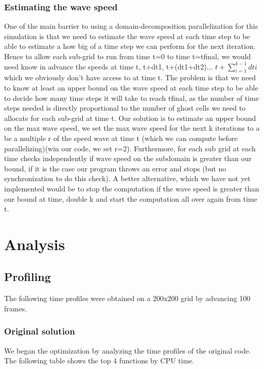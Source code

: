 \documentclass[11pt]{article}
\begin{document}
\subsubsection{Estimating the wave speed}
One of the main barrier to using a domain-decomposition parallelization for this simulation is that we need to estimate the wave speed at each time step to be able to estimate a how big of a time step we can perform for the next iteration. Hence to allow each sub-grid to run from time t=0 to time t=tfinal, we would need know in advance the speeds at time t, t+dt1, t+(dt1+dt2)... $t+\sum_{i=1}^{k-1}dti$ which we obviously don't have access to at time t. The problem is that we need to know at least an upper bound on the wave speed at each time step to be able to decide how many time steps it will take to reach tfinal, as the number of time steps needed is directly proportional to the number of ghost cells we need to allocate for each sub-grid at time t. Our solution is to estimate an upper bound on the max wave speed, we set the max wave speed for the next k iterations to a be a multiple r of the speed wave at time t (which we can compute before parallelizing)(win our code, we set r=2). Furthermore, for each sub grid at each time checks independently if wave speed on the subdomain is greater than our bound, if it is the case our program throws an error and stops (but no synchronization to do this check). A better alternative, which we have not yet implemented would be to stop the computation if the wave speed is greater than our bound at time, double k and start the computation all over again from time t.


\section{Analysis}
\subsection{Profiling} \label{sec:prof}

The following time profiles were obtained on a 200x200 grid by advancing 100 frames. 

\subsubsection{Original solution}
We began the optimization by analyzing the time profiles of the original code. The following table shows the top 4 functions by CPU time. 

\end{document}
